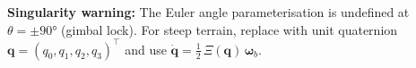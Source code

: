 \documentclass[12pt,a4paper]{article}
\begin{document}
\noindent\textbf{Singularity warning:}
The Euler angle parameterisation is undefined at $\theta = \pm90°$ (gimbal lock).
For steep terrain, replace with unit quaternion
$\mathbf{q} = (q_0,q_1,q_2,q_3)^\top$ and use
$\dot{\mathbf{q}} = \tfrac{1}{2}\,\Xi(\mathbf{q})\,\bm\omega_b$.

\end{document}
